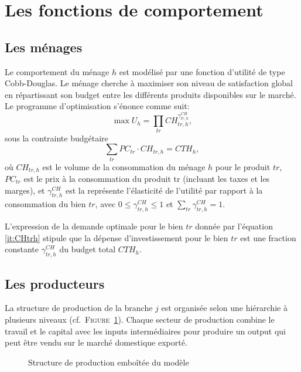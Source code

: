\documentclass[11pt,a4paper]{article}
\newcommand{\CH}{\mathit{CH}}
\newcommand{\CTH}{\mathit{CTH}}
\newcommand{\PC}{\mathit{PC}}
\newcommand{\tr}{\mathit{tr}}
\begin{document}
	
	
	\section{Les fonctions de comportement}
	\subsection{Les ménages}
	Le comportement du ménage $h$ est modélisé par une fonction d'utilité de type Cobb-Douglas. Le ménage cherche à maximiser son niveau de satisfaction global en répartissant son budget entre les différents produits disponibles sur le marché. Le programme d'optimisation s'énonce comme suit:
	\begin{equation}
		\max U_h = \prod_{\tr}^{} \CH_{tr,h}^{\gamma^{\CH}_{\tr,h}},
	\end{equation}
	sous la contrainte budgétaire
	\begin{equation}
		\sum_{\tr} \PC_{\tr}\cdot\CH_{\tr,h} = \CTH_h,
	\end{equation}
	où $\CH_{\tr,h}$ est le volume de la consommation du ménage $h$ pour le produit $\tr$, $\PC_{\tr}$ est le prix à la consommation du produit tr (incluant les taxes et les marges), et $\gamma^{\CH}_{\tr,h}$ est la représente l'élasticité de l'utilité par rapport à la consommation du bien  $\tr$, avec $0\leq \gamma^{\CH}_{\tr,h}\leq 1 $ et $\sum_{\tr}\gamma^{\CH}_{\tr,h}=1$.
	
	L'expression de la demande optimale pour le bien $\tr$  donnée par l'équation \ref{it:CHtrh} stipule que la dépense d'investissement pour le bien $\tr$ est une fraction constante $\gamma^{\CH}_{\tr,h}$ du budget total $\CTH_h$.
	\subsection{Les producteurs}
	La structure de production de la branche $j$ est organisée selon une hiérarchie à plusieurs niveaux (cf.~\textsc{Figure}~\ref{fig:xsvaci}). Chaque secteur de production combine le travail et le capital avec les inputs intermédiaires pour produire un output qui peut être vendu sur le marché domestique exporté.
	
	
	\begin{figure}[!htbp]
		\centering
		
		\caption{Structure de production emboîtée du modèle}
		\label{fig:xsvaci}
	\end{figure}
	
\end{document}
